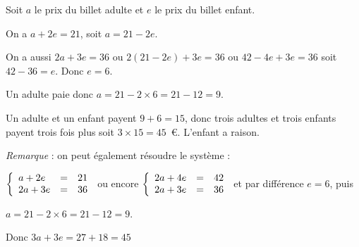 
\medskip  

%
%
%
%
Soit $a$ le prix du billet adulte et $e$ le prix du billet enfant.

On a $a + 2e = 21$, soit $a = 21 - 2e$.

On a aussi $2a + 3e = 36$ ou $2(21 - 2e) + 3e = 36$ ou $42 - 4e + 3e = 36$ soit $42 - 36 = e$. Donc $e = 6$.

Un adulte paie donc $a = 21 - 2\times 6 = 21 - 12 = 9$.

Un adulte et un enfant payent $9 + 6 = 15$, donc trois adultes et trois enfants payent trois fois plus soit $3 \times 15 = 45$~\euro. L'enfant a raison.

\emph{Remarque} : on peut également résoudre le système :

$\left\{\begin{array}{l c l}
a + 2e&=&21\\
2a + 3e&=&36
\end{array}\right.$ ou encore $\left\{\begin{array}{l c l}
2a + 4e&=&42\\
2a + 3e&=&36
\end{array}\right.$ et par différence $e = 6$, puis 

$a = 21 - 2\times 6 = 21 - 12 = 9$.

Donc $3a + 3e = 27 + 18 = 45$
